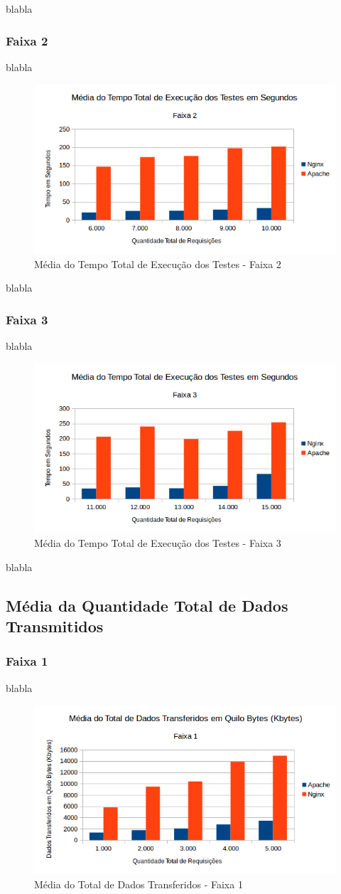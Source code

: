 blabla

\subsubsection{Faixa 2}
blabla

\begin{figure}[htb]
	\centering
	\includegraphics[width=0.6\linewidth]{graficos/grafico1-f2} 
	\caption{Média do Tempo Total de Execução dos Testes - Faixa 2}
	\label{fig:grafico1-f2}
\end{figure}
blabla

\subsubsection{Faixa 3}
blabla

\begin{figure}[htb]
	\centering
	\includegraphics[width=0.6\linewidth]{graficos/grafico1-f3} 
	\caption{Média do Tempo Total de Execução dos Testes - Faixa 3}
	\label{fig:grafico1-f3}
\end{figure}
blabla


\subsection{Média da Quantidade Total de Dados Transmitidos}
\subsubsection{Faixa 1}

blabla
\begin{figure}[htb]
	\centering
	\includegraphics[width=0.6\linewidth]{graficos/grafico2-f1} 
	\caption{Média do Total de Dados Transferidos - Faixa 1}
	\label{fig:grafico2-f1}
\end{figure}

